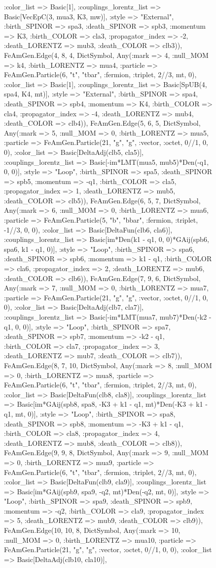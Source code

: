\documentclass{revtex4}
\begin{document}
\begin{figure}[!htb]
\begin{center}
{:color_list => Basic[1], :couplings_lorentz_list => Basic[VecEpC(3, mua3, K3, mw)], :style => "External", :birth_SPINOR => spa3, :death_SPINOR => spb3, :momentum => K3, :birth_COLOR => cla3, :propagator_index => -2, :death_LORENTZ => mub3, :death_COLOR => clb3)), FeAmGen.Edge(4, 8, 4, Dict{Symbol, Any}(:mark => 4, :null_MOM => k4, :birth_LORENTZ => mua4, :particle => FeAmGen.Particle(6, "t", "tbar", :fermion, :triplet, 2//3, mt, 0), :color_list => Basic[1], :couplings_lorentz_list => Basic[SpUB(4, spa4, K4, mt)], :style => "External", :birth_SPINOR => spa4, :death_SPINOR => spb4, :momentum => K4, :birth_COLOR => cla4, :propagator_index => -4, :death_LORENTZ => mub4, :death_COLOR => clb4)), FeAmGen.Edge(5, 6, 5, Dict{Symbol, Any}(:mark => 5, :null_MOM => 0, :birth_LORENTZ => mua5, :particle => FeAmGen.Particle(21, "g", "g", :vector, :octet, 0//1, 0, 0), :color_list => Basic[DeltaAdj(clb5, cla5)], :couplings_lorentz_list => Basic[-im*LMT(mua5, mub5)*Den(-q1, 0, 0)], :style => "Loop", :birth_SPINOR => spa5, :death_SPINOR => spb5, :momentum => -q1, :birth_COLOR => cla5, :propagator_index => 1, :death_LORENTZ => mub5, :death_COLOR => clb5)), FeAmGen.Edge(6, 5, 7, Dict{Symbol, Any}(:mark => 6, :null_MOM => 0, :birth_LORENTZ => mua6, :particle => FeAmGen.Particle(5, "b", "bbar", :fermion, :triplet, -1//3, 0, 0), :color_list => Basic[DeltaFun(clb6, cla6)], :couplings_lorentz_list => Basic[im*Den(k1 - q1, 0, 0)*GAij(spb6, spa6, k1 - q1, 0)], :style => "Loop", :birth_SPINOR => spa6, :death_SPINOR => spb6, :momentum => k1 - q1, :birth_COLOR => cla6, :propagator_index => 2, :death_LORENTZ => mub6, :death_COLOR => clb6)), FeAmGen.Edge(7, 9, 6, Dict{Symbol, Any}(:mark => 7, :null_MOM => 0, :birth_LORENTZ => mua7, :particle => FeAmGen.Particle(21, "g", "g", :vector, :octet, 0//1, 0, 0), :color_list => Basic[DeltaAdj(clb7, cla7)], :couplings_lorentz_list => Basic[-im*LMT(mua7, mub7)*Den(-k2 - q1, 0, 0)], :style => "Loop", :birth_SPINOR => spa7, :death_SPINOR => spb7, :momentum => -k2 - q1, :birth_COLOR => cla7, :propagator_index => 3, :death_LORENTZ => mub7, :death_COLOR => clb7)), FeAmGen.Edge(8, 7, 10, Dict{Symbol, Any}(:mark => 8, :null_MOM => 0, :birth_LORENTZ => mua8, :particle => FeAmGen.Particle(6, "t", "tbar", :fermion, :triplet, 2//3, mt, 0), :color_list => Basic[DeltaFun(clb8, cla8)], :couplings_lorentz_list => Basic[im*GAij(spb8, spa8, -K3 + k1 - q1, mt)*Den(-K3 + k1 - q1, mt, 0)], :style => "Loop", :birth_SPINOR => spa8, :death_SPINOR => spb8, :momentum => -K3 + k1 - q1, :birth_COLOR => cla8, :propagator_index => 4, :death_LORENTZ => mub8, :death_COLOR => clb8)), FeAmGen.Edge(9, 9, 8, Dict{Symbol, Any}(:mark => 9, :null_MOM => 0, :birth_LORENTZ => mua9, :particle => FeAmGen.Particle(6, "t", "tbar", :fermion, :triplet, 2//3, mt, 0), :color_list => Basic[DeltaFun(clb9, cla9)], :couplings_lorentz_list => Basic[im*GAij(spb9, spa9, -q2, mt)*Den(-q2, mt, 0)], :style => "Loop", :birth_SPINOR => spa9, :death_SPINOR => spb9, :momentum => -q2, :birth_COLOR => cla9, :propagator_index => 5, :death_LORENTZ => mub9, :death_COLOR => clb9)), FeAmGen.Edge(10, 10, 8, Dict{Symbol, Any}(:mark => 10, :null_MOM => 0, :birth_LORENTZ => mua10, :particle => FeAmGen.Particle(21, "g", "g", :vector, :octet, 0//1, 0, 0), :color_list => Basic[DeltaAdj(clb10, cla10)], }
\end{center}
\end{figure}
\end{document}
